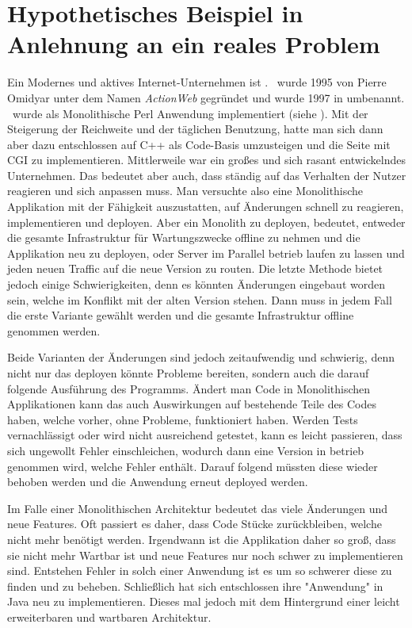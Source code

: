 \section[Beispiel]{Hypothetisches Beispiel in Anlehnung an ein reales Problem}
\label{sec:beispielEbay}
Ein Modernes und aktives Internet-Unternehmen ist \ebay . \ebay\ wurde 1995 von Pierre Omidyar unter dem Namen \textit{ActionWeb} gegründet und wurde 1997 in \ebay umbenannt. \ebay\ wurde als Monolithische Perl Anwendung implementiert (siehe \cite{wiki:ebay}). Mit der Steigerung der Reichweite und der täglichen Benutzung, hatte man sich dann aber dazu entschlossen auf C++ als Code-Basis umzusteigen und die Seite mit CGI zu implementieren. Mittlerweile war \ebay ein großes und sich rasant entwickelndes Unternehmen. Das bedeutet aber auch, dass \ebay ständig auf das Verhalten der Nutzer reagieren und sich anpassen muss. Man versuchte also eine Monolithische Applikation mit der Fähigkeit auszustatten, auf Änderungen schnell zu reagieren, implementieren und deployen. Aber ein Monolith zu deployen, bedeutet, entweder die gesamte Infrastruktur für Wartungszwecke offline zu nehmen und die Applikation neu zu deployen, oder Server im Parallel betrieb laufen zu lassen und jeden neuen Traffic auf die neue Version zu routen. Die letzte Methode bietet jedoch einige Schwierigkeiten, denn es könnten Änderungen eingebaut worden sein, welche im Konflikt mit der alten Version stehen. Dann muss in jedem Fall die erste Variante gewählt werden und die gesamte Infrastruktur offline genommen werden.

Beide Varianten der Änderungen sind jedoch zeitaufwendig und  schwierig, denn nicht nur das deployen könnte Probleme bereiten, sondern auch die darauf folgende Ausführung des Programms. Ändert man Code in Monolithischen Applikationen kann das auch Auswirkungen auf bestehende Teile des Codes haben, welche vorher, ohne Probleme, funktioniert haben. Werden Tests vernachlässigt oder wird nicht ausreichend getestet, kann es leicht passieren, dass sich ungewollt Fehler einschleichen, wodurch dann eine Version in betrieb genommen wird, welche Fehler enthält. Darauf folgend müssten diese wieder behoben werden und die Anwendung erneut deployed werden.

Im Falle einer Monolithischen Architektur bedeutet das viele Änderungen und neue Features. Oft passiert es daher, dass Code Stücke zurückbleiben, welche nicht mehr benötigt werden. Irgendwann ist die Applikation daher so groß, dass sie nicht mehr Wartbar ist und neue Features nur noch schwer zu implementieren sind. Entstehen Fehler in solch einer Anwendung ist es um so schwerer diese zu finden und zu beheben. Schließlich hat sich \ebay entschlossen ihre "Anwendung" in Java neu zu implementieren. Dieses mal jedoch mit dem Hintergrund einer leicht erweiterbaren und wartbaren Architektur.

